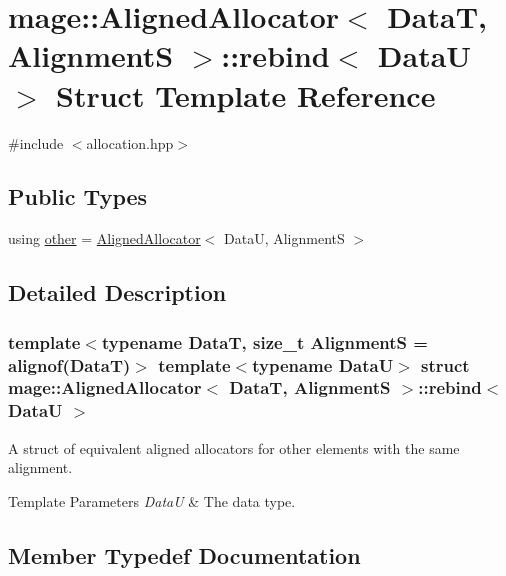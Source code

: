 \hypertarget{structmage_1_1_aligned_allocator_1_1rebind}{}\section{mage\+:\+:Aligned\+Allocator$<$ DataT, AlignmentS $>$\+:\+:rebind$<$ DataU $>$ Struct Template Reference}
\label{structmage_1_1_aligned_allocator_1_1rebind}


{\ttfamily \#include $<$allocation.\+hpp$>$}

\subsection*{Public Types}
\begin{DoxyCompactItemize}
\item 
using \hyperlink{structmage_1_1_aligned_allocator_1_1rebind_aeb2e9c9add001b8f603f5b67ad8fee56}{other} = \hyperlink{classmage_1_1_aligned_allocator}{Aligned\+Allocator}$<$ DataU, AlignmentS $>$
\end{DoxyCompactItemize}


\subsection{Detailed Description}
\subsubsection*{template$<$typename DataT, size\+\_\+t AlignmentS = alignof(\+Data\+T)$>$\newline
template$<$typename DataU$>$\newline
struct mage\+::\+Aligned\+Allocator$<$ Data\+T, Alignment\+S $>$\+::rebind$<$ Data\+U $>$}

A struct of equivalent aligned allocators for other elements with the same alignment.


\begin{DoxyTemplParams}{Template Parameters}
{\em DataU} & The data type. \\
\hline
\end{DoxyTemplParams}


\subsection{Member Typedef Documentation}
\hypertarget{structmage_1_1_aligned_allocator_1_1rebind_aeb2e9c9add001b8f603f5b67ad8fee56}{}\label{structmage_1_1_aligned_allocator_1_1rebind_aeb2e9c9add001b8f603f5b67ad8fee56} 
